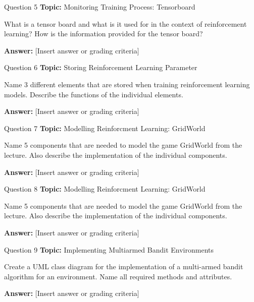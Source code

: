 \begin{frame}{Question 5}
    \textbf{Topic:} Monitoring Training Process: Tensorboard
    \vspace{10pt}

    What is a tensor board and what is it used for in the context of reinforcement learning? How is the information provided for the tensor board? 

    \vspace{20pt}

    \textbf{Answer:} [Insert answer or grading criteria]
\end{frame}

\begin{frame}{Question 6}
    \textbf{Topic:} Storing Reinforcement Learning Parameter
    \vspace{10pt}

    Name 3 different elements that are stored when training reinforcement learning models. Describe the functions of the individual elements.

    \vspace{20pt}

    \textbf{Answer:} [Insert answer or grading criteria]
\end{frame}

\begin{frame}{Question 7}
    \textbf{Topic:} Modelling Reinforcment Learning: GridWorld
    \vspace{10pt}

    Name 5 components that are needed to model the game GridWorld from the lecture. Also describe the implementation of the individual components.  
    \vspace{20pt}

    \textbf{Answer:} [Insert answer or grading criteria]
\end{frame}

\begin{frame}{Question 8}
    \textbf{Topic:} Modelling Reinforcment Learning: GridWorld
    \vspace{10pt}

    Name 5 components that are needed to model the game GridWorld from the lecture. Also describe the implementation of the individual components.  
    \vspace{20pt}

    \textbf{Answer:} [Insert answer or grading criteria]
\end{frame}

\begin{frame}{Question 9}
    \textbf{Topic:} Implementing Multiarmed Bandit Environments
    \vspace{10pt}

    Create a UML class diagram for the implementation of a multi-armed bandit algorithm for an environment. Name all required methods and attributes. 
    \vspace{20pt}

    \textbf{Answer:} [Insert answer or grading criteria]
\end{frame}

